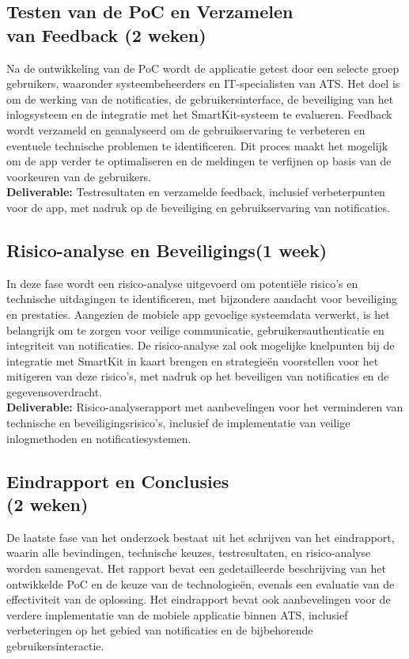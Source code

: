 \subsection{Testen van de PoC en Verzamelen \\van Feedback (2 weken)}
\noindent Na de ontwikkeling van de PoC wordt de applicatie getest door een selecte groep gebruikers, waaronder systeembeheerders en IT-specialisten van ATS. Het doel is om de werking van de notificaties, de gebruikersinterface, de beveiliging van het inlogsysteem en de integratie met het SmartKit-systeem te evalueren. Feedback wordt verzameld en geanalyseerd om de gebruikservaring te verbeteren en eventuele technische problemen te identificeren. Dit proces maakt het mogelijk om de app verder te optimaliseren en de meldingen te verfijnen op basis van de voorkeuren van de gebruikers. \\

\noindent \textbf{Deliverable:} Testresultaten en verzamelde feedback, inclusief verbeterpunten voor de app, met nadruk op de beveiliging en gebruikservaring van notificaties.

\subsection{Risico-analyse en Beveiligings\overwegingen (1 week)}
\noindent In deze fase wordt een risico-analyse uitgevoerd om potentiële risico’s en technische uitdagingen te identificeren, met bijzondere aandacht voor beveiliging en prestaties. Aangezien de mobiele app gevoelige systeemdata verwerkt, is het belangrijk om te zorgen voor veilige communicatie, gebruikersauthenticatie en integriteit van notificaties. De risico-analyse zal ook mogelijke knelpunten bij de integratie met SmartKit in kaart brengen en strategieën voorstellen voor het mitigeren van deze risico’s, met nadruk op het beveiligen van notificaties en de gegevensoverdracht. \\

\noindent \textbf{Deliverable:} Risico-analyserapport met aanbevelingen voor het verminderen van technische en beveiligingsrisico’s, inclusief de implementatie van veilige inlogmethoden en notificatiesystemen.

\subsection{Eindrapport en Conclusies \\(2 weken)}
\noindent De laatste fase van het onderzoek bestaat uit het schrijven van het eindrapport, waarin alle bevindingen, technische keuzes, testresultaten, en risico-analyse worden samengevat. Het rapport bevat een gedetailleerde beschrijving van het ontwikkelde PoC en de keuze van de technologieën, evenals een evaluatie van de effectiviteit van de oplossing. Het eindrapport bevat ook aanbevelingen voor de verdere implementatie van de mobiele applicatie binnen ATS, inclusief verbeteringen op het gebied van notificaties en de bijbehorende gebruikersinteractie. \\

